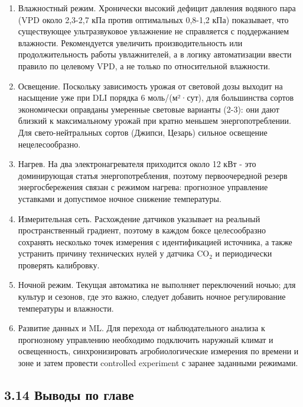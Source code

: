 \documentclass[a4paper,14pt]{extarticle}
\begin{document}
\begin{enumerate}
\def\labelenumi{\arabic{enumi})}
\item
  Влажностный режим. Хронически высокий дефицит давления водяного пара
  (VPD около 2,3-2,7 кПа против оптимальных 0,8-1,2 кПа) показывает, что
  существующее ультразвуковое увлажнение не справляется с поддержанием
  влажности. Рекомендуется увеличить производительность или
  продолжительность работы увлажнителей, а в логику автоматизации ввести
  правило по целевому VPD, а не только по относительной влажности.
\item
  Освещение. Поскольку зависимость урожая от световой дозы выходит на
  насыщение уже при DLI порядка 6 моль/(м²·сут), для большинства сортов
  экономически оправданы умеренные световые варианты (2-3): они дают
  близкий к максимальному урожай при кратно меньшем энергопотреблении.
  Для свето-нейтральных сортов (Джипси, Цезарь) сильное освещение
  нецелесообразно.
\item
  Нагрев. На два электронагревателя приходится около 12 кВт - это
  доминирующая статья энергопотребления, поэтому первоочередной резерв
  энергосбережения связан с режимом нагрева: прогнозное управление
  уставками и допустимое ночное снижение температуры.
\item
  Измерительная сеть. Расхождение датчиков указывает на реальный
  пространственный градиент, поэтому в каждом боксе целесообразно
  сохранять несколько точек измерения с идентификацией источника, а
  также устранить причину технических нулей у датчика CO\(_2\) и
  периодически проверять калибровку.
\item
  Ночной режим. Текущая автоматика не выполняет переключений ночью; для
  культур и сезонов, где это важно, следует добавить ночное
  регулирование температуры и влажности.
\item
  Развитие данных и ML. Для перехода от наблюдательного анализа к
  прогнозному управлению необходимо подключить наружный климат и
  освещенность, синхронизировать агробиологические измерения по времени
  и зоне и затем провести controlled experiment с заранее заданными
  режимами.
\end{enumerate}

\hypertarget{ux432ux44bux432ux43eux434ux44b-ux43fux43e-ux433ux43bux430ux432ux435-1}{%
\subsection{3.14 Выводы по
главе}\label{ux432ux44bux432ux43eux434ux44b-ux43fux43e-ux433ux43bux430ux432ux435-1}}
\end{document}

